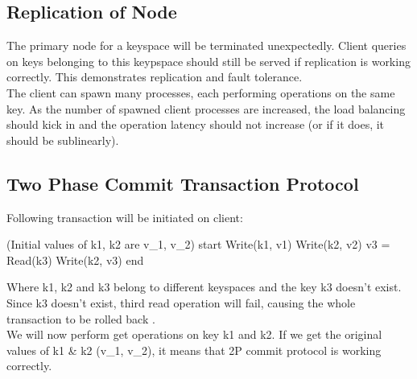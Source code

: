 \documentclass{article}
\begin{document}
\subsection{Replication of Node}
The primary node for a keyspace will be terminated unexpectedly. Client queries on keys belonging to this keypspace should still be served if replication is working correctly. This demonstrates replication and fault tolerance. \\
The client can spawn many processes, each performing operations on the same key. As the number of spawned client processes are increased, the load balancing should kick in and the operation latency should not increase (or if it does, it should be sublinearly).

\subsection{Two Phase Commit Transaction Protocol}
Following transaction will be initiated on client:
\begin{spverbatim}
(Initial values of k1, k2 are v_1, v_2)
start
    Write(k1, v1)
    Write(k2, v2)
    v3 = Read(k3)
    Write(k2, v3)
end

\end{spverbatim}
Where k1, k2 and k3 belong to different keyspaces and the key k3 doesn't exist. Since k3 doesn't exist, third read operation will fail, causing the whole transaction to be rolled back .\\
We will now perform get operations on key k1 and k2. If we get the original values of k1 \& k2 (v\_1, v\_2), it means that 2P commit protocol is working correctly.
\end{document}
